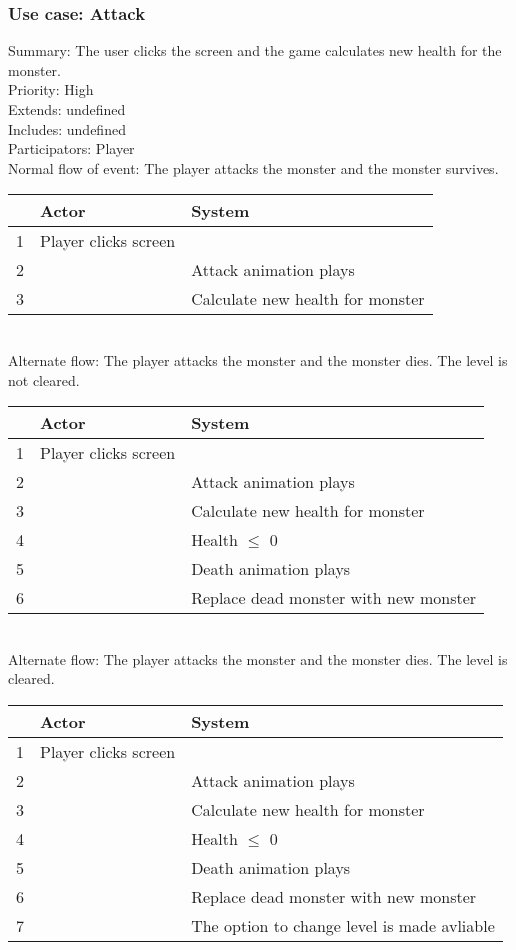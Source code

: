 \documentclass{article}
\begin{document}
\subsubsection{Use case: Attack}
Summary: The user clicks the screen and the game calculates new health for the monster.\\
Priority: High\\
Extends: undefined\\
Includes: undefined\\
Participators: Player\\
Normal flow of event: The player attacks the monster and the monster survives.
\begin{tabular}{| c | l | l |} \hline
    & Actor & System \\ \hline
    1 & Player clicks screen & \\ \hline
    2 & & Attack animation plays \\ \hline
    3 & & Calculate new health for monster\\ \hline
\end{tabular}\\
Alternate flow: The player attacks the monster and the monster dies. The level is not cleared.\\
\begin{tabular}{| c | l | l |} \hline
    & Actor & System \\ \hline
    1 & Player clicks screen & \\ \hline
    2 & & Attack animation plays \\ \hline
    3 & & Calculate new health for monster\\ \hline
    4 & & Health $\le$ 0 \\ \hline
    5 & & Death animation plays \\ \hline 
    6 & & Replace dead monster with new monster \\ \hline
\end{tabular}\\
Alternate flow: The player attacks the monster and the monster dies. The level is cleared.\\
\begin{tabular}{| c | l | l |} \hline
    & Actor & System \\ \hline
    1 & Player clicks screen & \\ \hline
    2 & & Attack animation plays \\ \hline
    3 & & Calculate new health for monster\\ \hline
    4 & & Health $\le$ 0 \\ \hline
    5 & & Death animation plays \\ \hline 
    6 & & Replace dead monster with new monster \\ \hline
    7 & & The option to change level is made avliable\\ \hline
\end{tabular}
\end{document}
